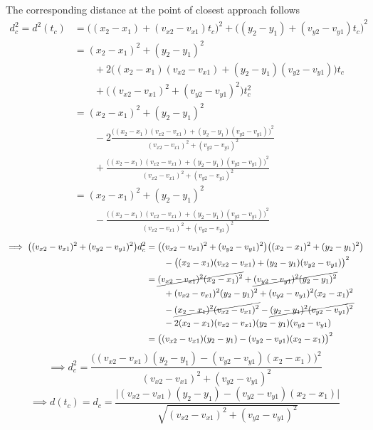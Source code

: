 The corresponding distance at the point of closest approach follows
\begin{align*}
    d_c^2
    = d^2(t_c)
     & =
    {\big((x_2 - x_1) + (v_{x2} - v_{x1})t_c\big)}^2 + {\big((y_2 - y_1) + (v_{y2} - v_{y1})t_c\big)}^2
    \\ & =
    (x_2 - x_1)^2 + (y_2 - y_1)^2
    \\ & \qquad
    + 2\big((x_2 - x_1)(v_{x2} - v_{x1}) + (y_2 - y_1)(v_{y2} - v_{y1})\big)t_c
    \\ & \qquad
    + \big((v_{x2} - v_{x1})^2 + (v_{y2} - v_{y1})^2\big)t_c^2
    \\ & =
    (x_2 - x_1)^2 + (y_2 - y_1)^2
    \\ & \qquad
    - 2\frac{{\big((x_2 - x_1)(v_{x2} - v_{x1}) + (y_2 - y_1)(v_{y2} - v_{y1})\big)}^2}{(v_{x2} - v_{x1})^2 + (v_{y2} - v_{y1})^2}
    \\ & \qquad
    + \frac{{\big((x_2 - x_1)(v_{x2} - v_{x1}) + (y_2 - y_1)(v_{y2} - v_{y1})\big)}^2}{(v_{x2} - v_{x1})^2 + (v_{y2} - v_{y1})^2}
    \\ & =
    (x_2 - x_1)^2 + (y_2 - y_1)^2
    \\ & \qquad
    - \frac{{\big((x_2 - x_1)(v_{x2} - v_{x1}) + (y_2 - y_1)(v_{y2} - v_{y1})\big)}^2}{(v_{x2} - v_{x1})^2 + (v_{y2} - v_{y1})^2}
\end{align*}
\begin{align*}
    \implies
    \big( (v_{x2} - v_{x1})^2 + (v_{y2} - v_{y1})^2 \big) d_c^2
     & =
    \big( (v_{x2} - v_{x1})^2 + (v_{y2} - v_{y1})^2 \big) \big( (x_2 - x_1)^2 + (y_2 - y_1)^2 \big)
    \\ & \qquad
    - \big( (x_2 - x_1)(v_{x2} - v_{x1}) + (y_2 - y_1)(v_{y2} - v_{y1}) \big)^2
    \\ & =
    \cancel{(v_{x2} - v_{x1})^2 (x_2 - x_1)^2} + \cancel{(v_{y2} - v_{y1})^2 (y_2 - y_1)^2}
    \\ & \qquad
    + (v_{x2} - v_{x1})^2 (y_2 - y_1)^2 + (v_{y2} - v_{y1})^2 (x_2 - x_1)^2
    \\ & \qquad
    - \cancel{(x_2 - x_1)^2 (v_{x2} - v_{x1})^2} - \cancel{(y_2 - y_1)^2 (v_{y2} - v_{y1})^2}
    \\ & \qquad
    - 2 (x_2 - x_1)(v_{x2} - v_{x1})(y_2 - y_1)(v_{y2} - v_{y1})
    \\ & =
    \big( (v_{x2} - v_{x1})(y_2 - y_1) - (v_{y2} - v_{y1})(x_2 - x_1) \big)^2
\end{align*}
\begin{equation*}
    \implies
    d_c^2
    =
    \frac{\big( (v_{x2} - v_{x1})(y_2 - y_1) - (v_{y2} - v_{y1})(x_2 - x_1) \big)^2}{(v_{x2} - v_{x1})^2 + (v_{y2} - v_{y1})^2}
\end{equation*}
\begin{equation*}
    \implies
    d(t_c) =
    \boxed{
        d_c
        =
        \frac{\big| (v_{x2} - v_{x1})(y_2 - y_1) - (v_{y2} - v_{y1})(x_2 - x_1) \big|}{\sqrt{(v_{x2} - v_{x1})^2 + (v_{y2} - v_{y1})^2}}
    }
\end{equation*}
